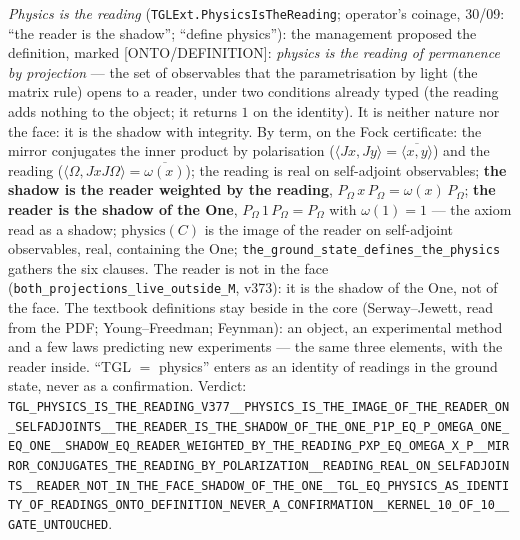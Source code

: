 \documentclass[11pt]{article}
\theoremstyle{definition}\newtheorem{deriv}{Derivation}
\begin{document}
\emph{Physics is the reading} (\texttt{TGLExt.PhysicsIsTheReading}; operator's coinage, 30/09: ``the reader is the shadow''; ``define physics''): the management proposed the definition, marked \textsf{[ONTO/DEFINITION]}: \emph{physics is the reading of permanence by projection} --- the set of observables that the parametrisation by light (the matrix rule) opens to a reader, under two conditions already typed (the reading adds nothing to the object; it returns $1$ on the identity). It is neither nature nor the face: it is the shadow with integrity. By term, on the Fock certificate: the mirror conjugates the inner product by polarisation ($\langle Jx,Jy\rangle=\overline{\langle x,y\rangle}$) and the reading ($\langle\Omega,JxJ\Omega\rangle=\overline{\omega(x)}$); the reading is real on self-adjoint observables; \textbf{the shadow is the reader weighted by the reading}, $P_\Omega\,x\,P_\Omega=\omega(x)\,P_\Omega$; \textbf{the reader is the shadow of the One}, $P_\Omega\,1\,P_\Omega=P_\Omega$ with $\omega(1)=1$ --- the axiom read as a shadow; $\mathrm{physics}(C)$ is the image of the reader on self-adjoint observables, real, containing the One; \texttt{the\_ground\_state\_defines\_the\_physics} gathers the six clauses. The reader is not in the face (\texttt{both\_projections\_live\_outside\_M}, v373): it is the shadow of the One, not of the face. The textbook definitions stay beside in the core (Serway--Jewett, read from the PDF; Young--Freedman; Feynman): an object, an experimental method and a few laws predicting new experiments --- the same three elements, with the reader inside. ``TGL $=$ physics'' enters as an identity of readings in the ground state, never as a confirmation. Verdict: \texttt{TGL\_PHYSICS\_IS\_THE\_READING\_V377\_\_PHYSICS\_IS\_THE\_IMAGE\_OF\_THE\_READER\_ON\_SELFADJOINTS\_\_THE\_READER\_IS\_THE\_SHADOW\_OF\_THE\_ONE\_P1P\_EQ\_P\_OMEGA\_ONE\_EQ\_ONE\_\_SHADOW\_EQ\_READER\_WEIGHTED\_BY\_THE\_READING\_PXP\_EQ\_OMEGA\_X\_P\_\_MIRROR\_CONJUGATES\_THE\_READING\_BY\_POLARIZATION\_\_READING\_REAL\_ON\_SELFADJOINTS\_\_READER\_NOT\_IN\_THE\_FACE\_SHADOW\_OF\_THE\_ONE\_\_TGL\_EQ\_PHYSICS\_AS\_IDENTITY\_OF\_READINGS\_ONTO\_DEFINITION\_NEVER\_A\_CONFIRMATION\_\_KERNEL\_10\_OF\_10\_\_GATE\_UNTOUCHED}.
\end{document}
